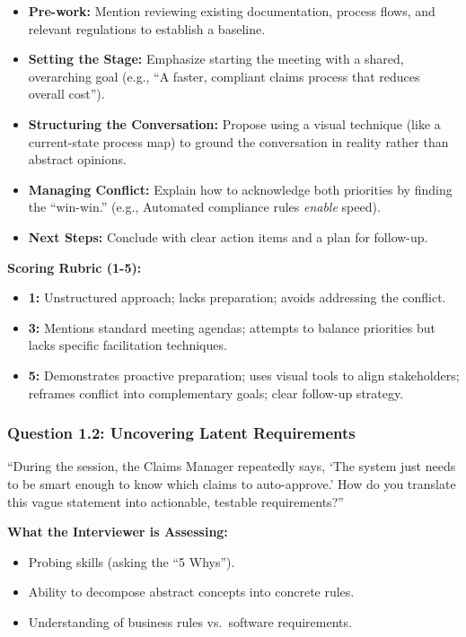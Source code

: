 \begin{itemize}
\tightlist
\item
  \textbf{Pre-work:} Mention reviewing existing documentation, process
  flows, and relevant regulations to establish a baseline.
\item
  \textbf{Setting the Stage:} Emphasize starting the meeting with a
  shared, overarching goal (e.g., ``A faster, compliant claims process
  that reduces overall cost'').
\item
  \textbf{Structuring the Conversation:} Propose using a visual
  technique (like a current-state process map) to ground the
  conversation in reality rather than abstract opinions.
\item
  \textbf{Managing Conflict:} Explain how to acknowledge both priorities
  by finding the ``win-win.'' (e.g., Automated compliance rules
  \emph{enable} speed).
\item
  \textbf{Next Steps:} Conclude with clear action items and a plan for
  follow-up.
\end{itemize}

\textbf{Scoring Rubric (1-5):}

\begin{itemize}
\tightlist
\item
  \textbf{1:} Unstructured approach; lacks preparation; avoids
  addressing the conflict.
\item
  \textbf{3:} Mentions standard meeting agendas; attempts to balance
  priorities but lacks specific facilitation techniques.
\item
  \textbf{5:} Demonstrates proactive preparation; uses visual tools to
  align stakeholders; reframes conflict into complementary goals; clear
  follow-up strategy.
\end{itemize}

\subsubsection{Question 1.2: Uncovering Latent
Requirements}\label{question-1.2-uncovering-latent-requirements}

``During the session, the Claims Manager repeatedly says, `The system
just needs to be smart enough to know which claims to auto-approve.' How
do you translate this vague statement into actionable, testable
requirements?''

\textbf{What the Interviewer is Assessing:}

\begin{itemize}
\tightlist
\item
  Probing skills (asking the ``5 Whys'').
\item
  Ability to decompose abstract concepts into concrete rules.
\item
  Understanding of business rules vs.~software requirements.
\end{itemize}

